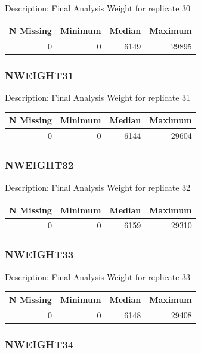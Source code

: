 \documentclass[
]{krantz}
\begin{document}
Description: Final Analysis Weight for replicate 30

\begin{tabular}[t]{r|r|r|r}
\hline
N Missing & Minimum & Median & Maximum\\
\hline
0 & 0 & 6149 & 29895\\
\hline
\end{tabular}

\hypertarget{nweight31}{%
\subsubsection*{NWEIGHT31}\label{nweight31}}


Description: Final Analysis Weight for replicate 31

\begin{tabular}[t]{r|r|r|r}
\hline
N Missing & Minimum & Median & Maximum\\
\hline
0 & 0 & 6144 & 29604\\
\hline
\end{tabular}

\hypertarget{nweight32}{%
\subsubsection*{NWEIGHT32}\label{nweight32}}


Description: Final Analysis Weight for replicate 32

\begin{tabular}[t]{r|r|r|r}
\hline
N Missing & Minimum & Median & Maximum\\
\hline
0 & 0 & 6159 & 29310\\
\hline
\end{tabular}

\hypertarget{nweight33}{%
\subsubsection*{NWEIGHT33}\label{nweight33}}


Description: Final Analysis Weight for replicate 33

\begin{tabular}[t]{r|r|r|r}
\hline
N Missing & Minimum & Median & Maximum\\
\hline
0 & 0 & 6148 & 29408\\
\hline
\end{tabular}

\hypertarget{nweight34}{%
\subsubsection*{NWEIGHT34}\label{nweight34}}
\end{document}
